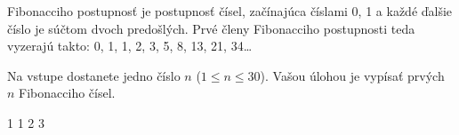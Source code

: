 




Fibonacciho postupnosť je postupnosť čísel, začínajúca číslami 0, 1 a každé ďalšie číslo je súčtom
dvoch predošlých.  Prvé členy Fibonacciho postupnosti teda vyzerajú takto: 0, 1, 1, 2, 3, 5, 8, 13,
21, 34\dots

Na vstupe dostanete jedno číslo $n$ ($1\leq n\leq 30$). Vašou úlohou je vypísať prvých $n$ Fibonacciho čísel.

 1 1 2 3 
\koniec


